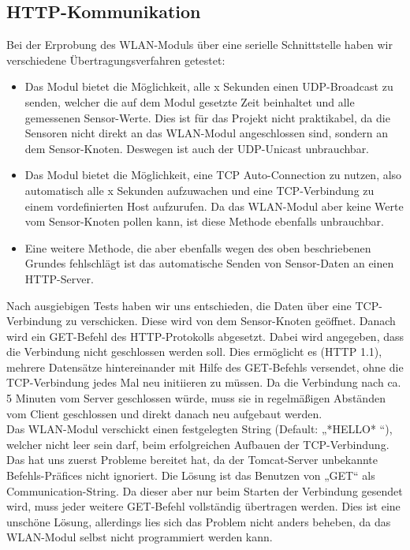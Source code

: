 \documentclass[12pt,a4paper,twoside]{article}
\begin{document}
\subsection{HTTP-Kommunikation}
\label{ssec:HTTP}
Bei der Erprobung des WLAN-Moduls über eine serielle Schnittstelle haben wir verschiedene Übertragungsverfahren getestet: 

\begin{itemize}
 \item Das Modul bietet die Möglichkeit, alle x Sekunden einen UDP-Broadcast zu senden, welcher die auf dem Modul gesetzte Zeit beinhaltet und alle gemessenen Sensor-Werte. Dies ist für das Projekt nicht praktikabel, da die Sensoren nicht direkt an das WLAN-Modul angeschlossen sind, sondern an dem Sensor-Knoten. Deswegen ist auch der UDP-Unicast unbrauchbar.
 \item Das Modul bietet die Möglichkeit, eine TCP Auto-Connection zu nutzen, also automatisch alle x Sekunden aufzuwachen und eine TCP-Verbindung zu einem vordefinierten Host aufzurufen. Da das WLAN-Modul aber keine Werte vom Sensor-Knoten pollen kann, ist diese Methode ebenfalls unbrauchbar. 
 \item Eine weitere Methode, die aber ebenfalls wegen des oben beschriebenen Grundes fehlschlägt ist das automatische Senden von Sensor-Daten an einen HTTP-Server. 
\end{itemize}

Nach ausgiebigen Tests haben wir uns entschieden, die Daten über eine TCP-Verbindung zu verschicken. Diese wird von dem Sensor-Knoten geöffnet. Danach wird ein GET-Befehl des HTTP-Protokolls abgesetzt. Dabei wird angegeben, dass die Verbindung nicht geschlossen werden soll. Dies ermöglicht es (HTTP 1.1), mehrere Datensätze hintereinander mit Hilfe des GET-Befehls versendet, ohne die TCP-Verbindung jedes Mal neu initiieren zu müssen. Da die Verbindung nach ca. 5 Minuten vom Server geschlossen würde, muss sie in regelmäßigen Abständen vom Client geschlossen und direkt danach neu aufgebaut werden.  \\
Das WLAN-Modul verschickt einen festgelegten String (Default: „*HELLO* “), welcher nicht leer sein darf, beim erfolgreichen Aufbauen der TCP-Verbindung. Das hat uns zuerst Probleme bereitet hat, da der Tomcat-Server unbekannte Befehls-Präfices nicht ignoriert. Die Lösung ist das Benutzen von „GET“ als Communication-String. Da dieser aber nur beim Starten der Verbindung gesendet wird, muss jeder weitere GET-Befehl vollständig übertragen werden. Dies ist eine unschöne Lösung, allerdings lies sich das Problem nicht anders beheben, da das WLAN-Modul selbst nicht programmiert werden kann.
\end{document}
